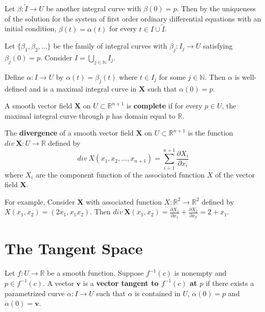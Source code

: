 	Let $\beta : \tilde{I} \to U$ be another integral curve with $\beta(0) = p$.
	Then by the uniqueness of the solution for the system of first order ordinary differential equations with an initial condition, $\beta(t) = \alpha(t)$ for every $ t \in I \cup \tilde{I}$.

	Let $\{\beta_1,\beta_2,\dots\}$ be the family of integral curves with $\beta_j : I_j \to U$ satisfying $\beta_j(0) = p$.
	Consider $I = \bigcup\limits_{j \in \mathbb{N}} I_j$.

	Define $\alpha : I \to U$ by $\alpha(t) = \beta_j(t)$ where $t \in I_j$ for some $j \in \mathbb{N}$.
	Then $\alpha$ is well-defined and is a maximal integral curve in $\boldsymbol{X}$ such that $\alpha(0) = p$.

\begin{definition}
	A smooth vector field $\boldsymbol{X}$ on $U \subset \mathbb{R}^{n+1}$ is \textbf{complete} if for every $p \in U$, the maximal integral curve through $p$ has domain equal to $\mathbb{R}$.
\end{definition}

\begin{definition}
	The \textbf{divergence} of a smooth vector field $\boldsymbol{X}$ on $U \subset \mathbb{R}^{n+1}$ is the function $div\ \boldsymbol{X} : U \to \mathbb{R}$ defined by
	\[ div\ X(x_1,x_2,\dots,x_{n+1}) = \sum_{i=1}^{n+1} \frac{\partial X_i}{\partial x_i} \]
	where $X_i$ are the component function of the associated function $X$ of the vector field $\boldsymbol{X}$.
\end{definition}

For example, Consider $\boldsymbol{X}$ with associated function $X : \mathbb{R}^2 \to \mathbb{R}^2$ defined by $X(x_1,x_2) = (2x_1,x_1x_2)$.
Then $div\ \boldsymbol{X}(x_1,x_2) = \frac{\partial X_1}{\partial x_1} + \frac{\partial X_2}{\partial x_2} = 2 + x_1$.

\section{The Tangent Space}
\begin{definition}
	Let $f:U \to \mathbb{R}$ be a smooth function.
	Suppose $f^{-1}(c)$ is nonempty and $p \in f^{-1}(c)$.
	A vector $\boldsymbol{v}$ is a \textbf{vector tangent to $f^{-1}(c)$ at $p$} if there exists a parametrized curve $\alpha : I \to U$ such that $\alpha$ is contained in $U$, $\alpha(0) = p$ and $\dot\alpha(0) = \boldsymbol{v}$.
\end{definition}

